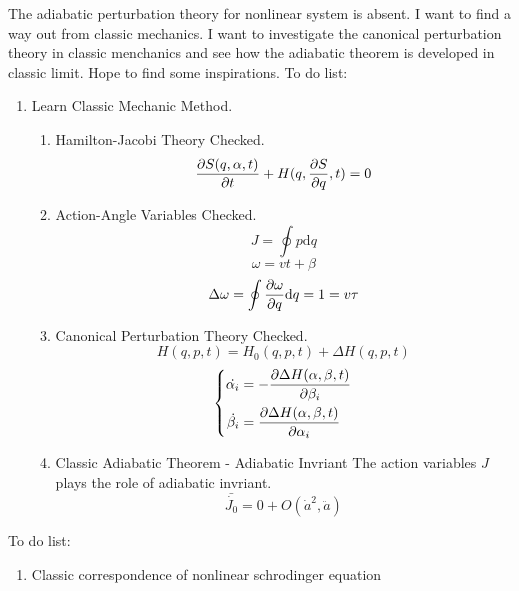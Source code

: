 \documentclass[fontsize=11pt, %
                             paper=a4, %
                             twoside, %
                             captions=tableheading,
                             index=totoc,
                             hyperref]{labbook}
\begin{document}
\begin{addmargin}[4cm]{0cm}
The adiabatic perturbation theory for nonlinear system is absent. I want to find a way out from classic mechanics. I want to investigate the canonical perturbation theory in classic menchanics and see how the adiabatic theorem is developed in classic limit. Hope to find some inspirations.
To do list:
\begin{enumerate}
\item
Learn Classic Mechanic Method.
\begin{enumerate}
\item
Hamilton-Jacobi Theory Checked.
\begin{equation}
\frac{\partial S(q,\alpha,t)}{\partial t}+H(q,\frac{\partial S}{\partial q},t)=0
\end{equation}
\item
Action-Angle Variables Checked.
\begin{equation}
J=\oint p\mathrm{d}q
\end{equation}
\begin{equation}
\omega=vt+\beta
\end{equation}
\begin{equation}
\Delta \omega =\oint \frac{\partial \omega}{\partial q}\mathrm{d}q=1=v\tau
\end{equation}
\item
Canonical Perturbation Theory Checked.
\begin{equation}
H(q,p,t)=H_0(q,p,t)+\Delta H(q,p,t)
\end{equation}
\begin{equation}
\left\{
\begin{aligned}
\dot{\alpha_i}&=-\frac{\partial \Delta H(\alpha,\beta,t)}{\partial \beta_i}\\
\dot{\beta_i}&=\frac{\partial \Delta H(\alpha,\beta,t)}{\partial \alpha_i}
\end{aligned}
\right.
\end{equation}
\item
Classic Adiabatic Theorem - Adiabatic Invriant
The action variables $J$ plays the role of adiabatic invriant. 
\begin{equation}
\bar{\dot{J_0}}=0+O(\dot{a}^2,\ddot{a})
\end{equation}
\end{enumerate}
\end{enumerate}
To do list:
\begin{enumerate}
\item
Classic correspondence of nonlinear schrodinger equation

\end{enumerate}
\end{addmargin}
\end{document}
